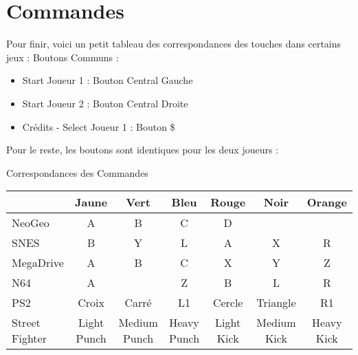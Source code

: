 \documentclass{article}
\begin{document}
\section*{Commandes}
Pour finir, voici un petit tableau des correspondances des touches dans certains jeux : 
Boutons Communs : 
\begin{itemize}
    \item Start Joueur 1 : Bouton Central Gauche
    \item Start Joueur 2 : Bouton Central Droite
    \item Crédits - Select Joueur 1 : Bouton \$
\end{itemize}
Pour le reste, les boutons sont identiques pour les deux joueurs : 
\begin{center}
    Correspondances des Commandes
    \begin{tabular}{lcccccc}
        \toprule
        & Jaune & Vert & Bleu & Rouge & Noir & Orange\\
        \midrule
        NeoGeo & A & B & C & D & & \\
        \midrule
        SNES & B & Y & L & A & X & R \\
        \midrule
        MegaDrive & A & B & C & X & Y & Z \\
        \midrule
        N64 & A &  & Z & B & L & R \\
        \midrule
        PS2 & Croix & Carré & L1 & Cercle & Triangle & R1 \\
        \midrule
        Street Fighter & Light Punch & Medium Punch & Heavy Punch & Light Kick & Medium Kick & Heavy Kick\\
        \bottomrule
    \end{tabular}

\end{center}
\end{document}
